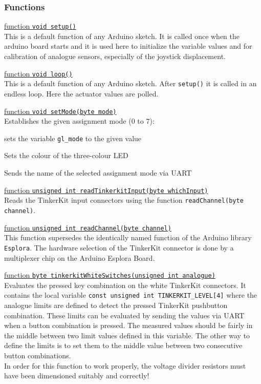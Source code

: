 \subsubsection*{Functions}
\uline{function \texttt{void setup()}}\\
This is a default function of any Arduino sketch. It is called once when
the arduino board starts and it is used here to initialize the variable
values and for calibration of analogue sensors, especially of the
joystick displacement.

\uline{function \texttt{void loop()}}\\
This is a default function of any Arduino sketch. After \texttt{setup()}
it is called in an endless loop. Here the actuator values are polled.

\uline{function \texttt{void setMode(byte mode)}}\\
Establishes the given assignment mode (0 to 7):
\begin{compactitem}
	\item sets the variable \texttt{gl\_mode} to the given value
	\item Sets the colour of the three-colour LED
	\item Sends the name of the selected assignment mode via UART
\end{compactitem}

\uline{function \texttt{unsigned int readTinkerkitInput(byte whichInput)}}\\
Reads the TinkerKit input connectors using the function
\texttt{readChannel(byte channel)}.

\uline{function \texttt{unsigned int readChannel(byte channel)}}\\
This function supersedes the identically named function of the
Arduino library \texttt{Esplora}. The hardware selection of the
TinkerKit connector is done by a multiplexer chip on the Arduino Esplora
Board.

\uline{function \texttt{byte tinkerkitWhiteSwitches(unsigned int analogue)}}\\
Evaluates the pressed key combination on the white TinkerKit connectors.
It contains the local variable \texttt{const unsigned int 
TINKERKIT\_LEVEL[4]} where the analogue limits are defined to detect the
pressed TinkerKit pushbutton combination. These limits can be evaluated
by sending the values via UART when a button combination is pressed. The
measured values should be fairly in the middle between two limit
values defined in this variable. The other way to define the limits is 
to set them to the middle value between two consecutive button
combinations.\\
In order for this function to work properly, the voltage divider
resistors must have been dimensioned suitably and correctly!


